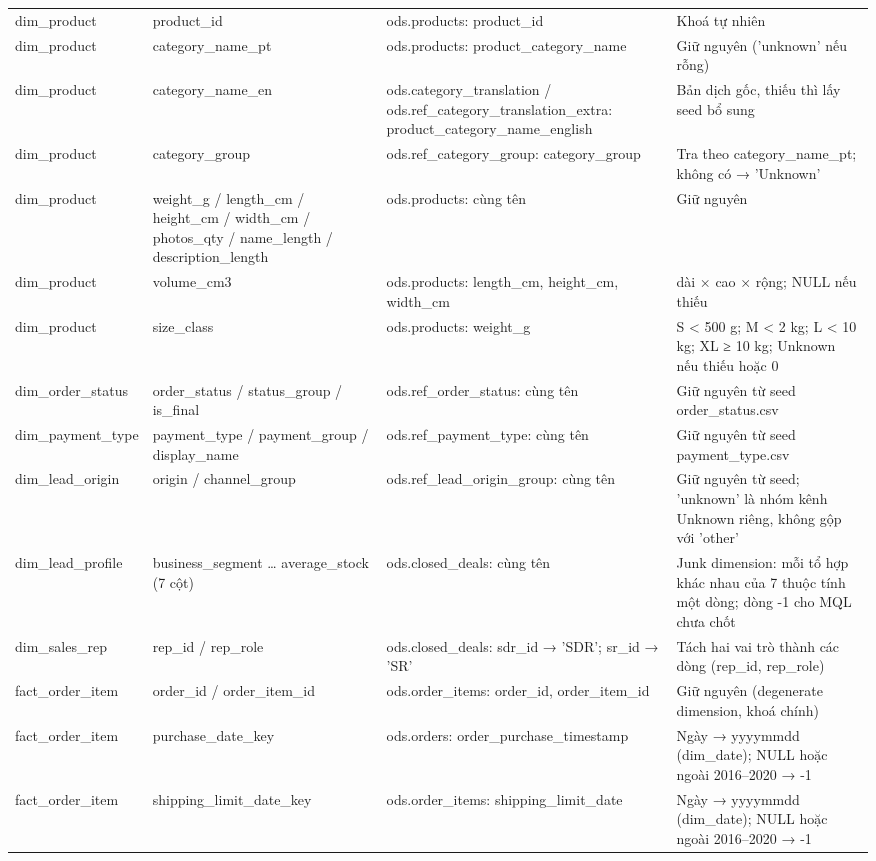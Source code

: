 {\begin{longtable}{p{2.4cm}p{3.1cm}p{3.6cm}p{5.4cm}}
dim\_product & product\_id & ods.products: product\_id & Khoá tự nhiên \\
dim\_product & category\_name\_pt & ods.products: product\_category\_name & Giữ nguyên ('unknown' nếu rỗng) \\
dim\_product & category\_name\_en & ods.category\_translation / ods.ref\_category\_translation\_extra: product\_category\_name\_english & Bản dịch gốc, thiếu thì lấy seed bổ sung \\
dim\_product & category\_group & ods.ref\_category\_group: category\_group & Tra theo category\_name\_pt; không có → 'Unknown' \\
dim\_product & weight\_g / length\_cm / height\_cm / width\_cm / photos\_qty / name\_length / description\_length & ods.products: cùng tên & Giữ nguyên \\
dim\_product & volume\_cm3 & ods.products: length\_cm, height\_cm, width\_cm & dài × cao × rộng; NULL nếu thiếu \\
dim\_product & size\_class & ods.products: weight\_g & S < 500 g; M < 2 kg; L < 10 kg; XL ≥ 10 kg; Unknown nếu thiếu hoặc 0 \\
dim\_order\_status & order\_status / status\_group / is\_final & ods.ref\_order\_status: cùng tên & Giữ nguyên từ seed order\_status.csv \\
dim\_payment\_type & payment\_type / payment\_group / display\_name & ods.ref\_payment\_type: cùng tên & Giữ nguyên từ seed payment\_type.csv \\
dim\_lead\_origin & origin / channel\_group & ods.ref\_lead\_origin\_group: cùng tên & Giữ nguyên từ seed; 'unknown' là nhóm kênh Unknown riêng, không gộp với 'other' \\
dim\_lead\_profile & business\_segment … average\_stock (7 cột) & ods.closed\_deals: cùng tên & Junk dimension: mỗi tổ hợp khác nhau của 7 thuộc tính một dòng; dòng -1 cho MQL chưa chốt \\
dim\_sales\_rep & rep\_id / rep\_role & ods.closed\_deals: sdr\_id → 'SDR'; sr\_id → 'SR' & Tách hai vai trò thành các dòng (rep\_id, rep\_role) \\
fact\_order\_item & order\_id / order\_item\_id & ods.order\_items: order\_id, order\_item\_id & Giữ nguyên (degenerate dimension, khoá chính) \\
fact\_order\_item & purchase\_date\_key & ods.orders: order\_purchase\_timestamp & Ngày → yyyymmdd (dim\_date); NULL hoặc ngoài 2016–2020 → -1 \\
fact\_order\_item & shipping\_limit\_date\_key & ods.order\_items: shipping\_limit\_date & Ngày → yyyymmdd (dim\_date); NULL hoặc ngoài 2016–2020 → -1 \\

\end{longtable}}
